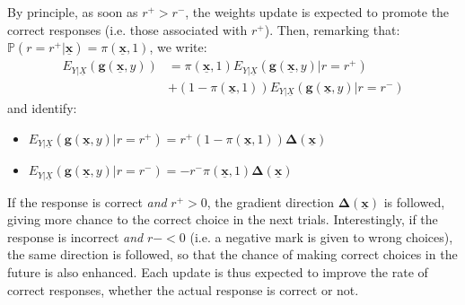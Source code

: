 \documentclass[conference]{IEEEtran}
\begin{document}
By principle, as soon as $r^+>r^-$,  the weights update
is expected to promote the correct responses (i.e. those associated with $r^+$). 
Then, remarking that:
$\mathbb{P}(r = r^+|\underline{\mathbf{x}}) =  \pi(\underline{\mathbf{x}},1)$, 
we write:
\begin{align*}
 E_{Y|\underline{X}}(\boldsymbol{g}(\underline{\mathbf{x}},y)) &= \pi(\underline{\mathbf{x}},1) E_{Y|\underline{X}}(\boldsymbol{g}(\underline{\mathbf{x}},y)|r = r^+)\\
&+ (1 - \pi(\underline{\mathbf{x}},1)) E_{Y|\underline{X}}(\boldsymbol{g}(\underline{\mathbf{x}},y)|r = r^-)
\end{align*}
and identify:
\begin{itemize}
  \item[] $E_{Y|\underline{X}}(\boldsymbol{g}(\underline{\mathbf{x}},y)|r = r^+) = r^+ (1 - \pi(\underline{\mathbf{x}},1)) \boldsymbol{\Delta}(\underline{\mathbf{x}})$
  \item[] $E_{Y|\underline{X}}(\boldsymbol{g}(\underline{\mathbf{x}},y)|r = r^-) = - r^- \pi(\underline{\mathbf{x}},1) \boldsymbol{\Delta}(\underline{\mathbf{x}})$
  \end{itemize}

If the response is correct \emph{and} $r^+ > 0$, the gradient direction $\boldsymbol{\Delta}(\underline{\mathbf{x}})$ 
is followed, giving more chance to the correct choice in the next trials.
Interestingly, if the response is incorrect \emph{and} $r- < 0$  (i.e. 
a negative mark is given to wrong choices), the same direction is followed,
so that the chance of making correct choices in the future is also enhanced.
Each update is thus expected to improve
the rate of correct responses, whether the actual response is correct or not.
\end{document}
